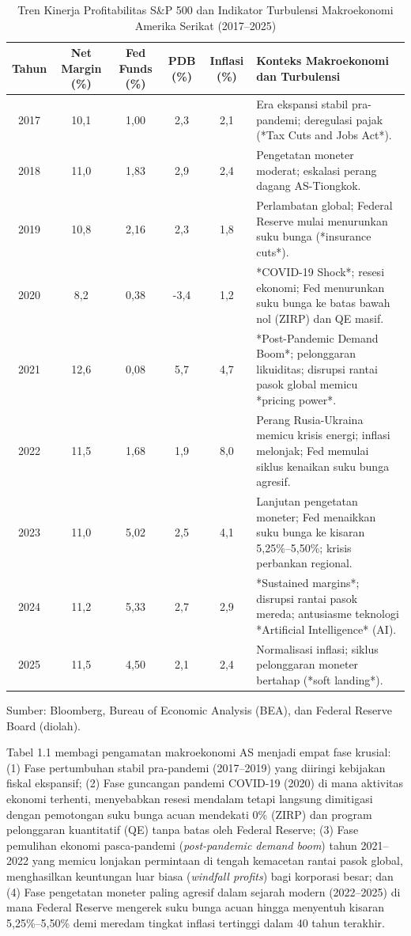 \documentclass[12pt,a4paper]{article}
\begin{document}
\begin{table}[H]
\caption{Tren Kinerja Profitabilitas S\&P 500 dan Indikator Turbulensi Makroekonomi Amerika Serikat (2017--2025)}
\label{tab:makro-turbulensi}
\centering
\begin{tabularx}{\textwidth}{c c c c c >{\raggedright\arraybackslash}X}
\toprule
\textbf{Tahun} & \textbf{Net Margin (\%)} & \textbf{Fed Funds (\%)} & \textbf{PDB (\%)} & \textbf{Inflasi (\%)} & \textbf{Konteks Makroekonomi dan Turbulensi} \\
\midrule
2017 & 10,1 & 1,00 & 2,3 & 2,1 & Era ekspansi stabil pra-pandemi; deregulasi pajak (*Tax Cuts and Jobs Act*). \\
2018 & 11,0 & 1,83 & 2,9 & 2,4 & Pengetatan moneter moderat; eskalasi perang dagang AS-Tiongkok. \\
2019 & 10,8 & 2,16 & 2,3 & 1,8 & Perlambatan global; Federal Reserve mulai menurunkan suku bunga (*insurance cuts*). \\
2020 & 8,2 & 0,38 & -3,4 & 1,2 & *COVID-19 Shock*; resesi ekonomi; Fed menurunkan suku bunga ke batas bawah nol (ZIRP) dan QE masif. \\
2021 & 12,6 & 0,08 & 5,7 & 4,7 & *Post-Pandemic Demand Boom*; pelonggaran likuiditas; disrupsi rantai pasok global memicu *pricing power*. \\
2022 & 11,5 & 1,68 & 1,9 & 8,0 & Perang Rusia-Ukraina memicu krisis energi; inflasi melonjak; Fed memulai siklus kenaikan suku bunga agresif. \\
2023 & 11,0 & 5,02 & 2,5 & 4,1 & Lanjutan pengetatan moneter; Fed menaikkan suku bunga ke kisaran 5,25\%--5,50\%; krisis perbankan regional. \\
2024 & 11,2 & 5,33 & 2,7 & 2,9 & *Sustained margins*; disrupsi rantai pasok mereda; antusiasme teknologi *Artificial Intelligence* (AI). \\
2025 & 11,5 & 4,50 & 2,1 & 2,4 & Normalisasi inflasi; siklus pelonggaran moneter bertahap (*soft landing*). \\
\bottomrule
\end{tabularx}
\vspace{0.5em}
{\small Sumber: Bloomberg, Bureau of Economic Analysis (BEA), dan Federal Reserve Board (diolah).}
\end{table}

Tabel 1.1 membagi pengamatan makroekonomi AS menjadi empat fase krusial:
(1) Fase pertumbuhan stabil pra-pandemi (2017--2019) yang diiringi
kebijakan fiskal ekspansif; (2) Fase guncangan pandemi COVID-19 (2020)
di mana aktivitas ekonomi terhenti, menyebabkan resesi mendalam tetapi
langsung dimitigasi dengan pemotongan suku bunga acuan mendekati 0\%
(ZIRP) dan program pelonggaran kuantitatif (QE) tanpa batas oleh Federal
Reserve; (3) Fase pemulihan ekonomi pasca-pandemi (\emph{post-pandemic
demand boom}) tahun 2021--2022 yang memicu lonjakan permintaan di tengah
kemacetan rantai pasok global, menghasilkan keuntungan luar biasa
(\emph{windfall profits}) bagi korporasi besar; dan (4) Fase pengetatan
moneter paling agresif dalam sejarah modern (2022--2025) di mana Federal
Reserve mengerek suku bunga acuan hingga menyentuh kisaran
5,25\%--5,50\% demi meredam tingkat inflasi tertinggi dalam 40 tahun
terakhir.
\end{document}
